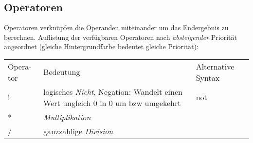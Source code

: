 \subsection{Operatoren}

Operatoren verknüpfen die Operanden miteinander um das Endergebnis zu
berechnen. Auflistung der verfügbaren Operatoren nach
\emph{absteigender} Priorität angeordnet (gleiche Hintergrundfarbe
bedeutet gleiche Priorität):

\begin{longtable}[c]{@{}lll@{}}
\hline\noalign{\medskip}
\begin{minipage}[b]{0.08\columnwidth}\raggedright
Opera-tor
\end{minipage} & \begin{minipage}[b]{0.77\columnwidth}\raggedright
Bedeutung
\end{minipage} & \begin{minipage}[b]{0.15\columnwidth}\raggedright
Alternative Syntax
\end{minipage}
\\\noalign{\medskip}
\hline\noalign{\medskip}
\begin{minipage}[t]{0.08\columnwidth}\raggedright
!
\end{minipage} & \begin{minipage}[t]{0.77\columnwidth}\raggedright
logisches \emph{Nicht}, Negation: Wandelt einen Wert ungleich 0 in 0 um
bzw umgekehrt
\end{minipage} & \begin{minipage}[t]{0.15\columnwidth}\raggedright
not
\end{minipage}
\\\noalign{\medskip}
\begin{minipage}[t]{0.08\columnwidth}\raggedright
*
\end{minipage} & \begin{minipage}[t]{0.77\columnwidth}\raggedright
\emph{Multiplikation}
\end{minipage} & \begin{minipage}[t]{0.15\columnwidth}\raggedright
\end{minipage}
\\\noalign{\medskip}
\begin{minipage}[t]{0.08\columnwidth}\raggedright
/
\end{minipage} & \begin{minipage}[t]{0.77\columnwidth}\raggedright
ganzzahlige \emph{Division}
\end{minipage} & \begin{minipage}[t]{0.15\columnwidth}\raggedright

\end{minipage}
\end{longtable}
